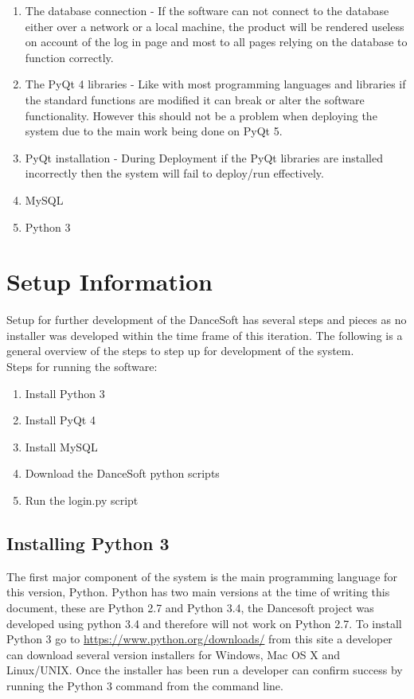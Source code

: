 \begin{enumerate}
\item The database connection - If the software can not connect to the database either over a network or a local machine, the product will be rendered useless on account of the log in page and most to all pages relying on the database to function correctly.
\item The PyQt 4 libraries - Like with most programming languages and libraries if the standard functions are modified it can break or alter the software functionality. However this should not be a problem when deploying the system due to the main work being done on PyQt 5.
\item PyQt installation - During Deployment if the PyQt libraries are installed incorrectly then the system will fail to deploy/run effectively.
\item MySQL
\item Python 3
\end{enumerate}



\section{Setup Information}
Setup for further development of the DanceSoft has several steps and pieces as no installer was developed within the time frame of this iteration. The following is a general overview of the steps to step up for development of the system.\\

Steps for running the software:\\

\begin{enumerate}
\item Install Python 3
\item Install PyQt 4
\item Install MySQL
\item Download the DanceSoft python scripts
\item Run the login.py script
\end{enumerate}

\subsection{Installing Python 3}
The first major component of the system is the main programming language for this version, Python. Python has two main versions at the time of writing this document, these are Python 2.7 and Python 3.4, the Dancesoft project was developed using python 3.4 and therefore will not work on Python 2.7.
To install Python 3 go to \url{https://www.python.org/downloads/} from this site a developer can download several version installers for Windows, Mac OS X and Linux/UNIX. Once the installer has been run a developer can confirm success by running the Python 3 command from the command line.

